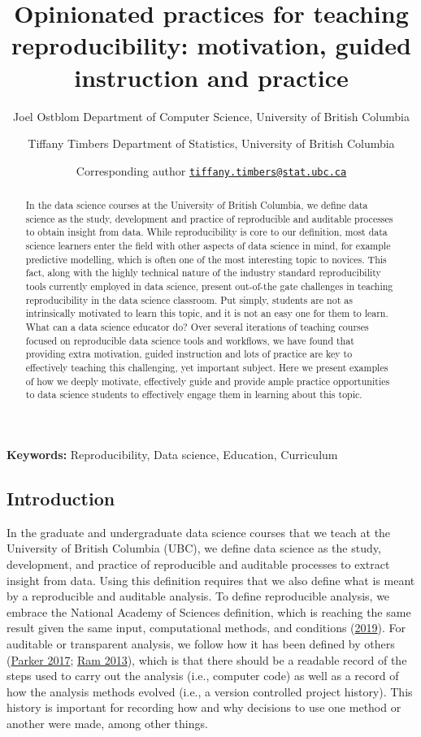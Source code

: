 \documentclass[
  12 pt,
]{paper}
\title{Opinionated practices for teaching reproducibility: motivation, guided instruction and practice}
\author{Joel Ostblom \small Department of Computer Science, University of British Columbia \and Tiffany Timbers \small Department of Statistics, University of British Columbia \and \footnotesize Corresponding author \href{mailto:tiffany.timbers@stat.ubc.ca}{\nolinkurl{tiffany.timbers@stat.ubc.ca}}}
\date{}
\begin{document}
\maketitle
\begin{abstract}
In the data science courses at the University of British Columbia,
we define data science as the study, development
and practice of reproducible
and auditable processes to obtain insight from data.
While reproducibility is core to our definition,
most data science learners enter the field with other aspects of data science in mind,
for example predictive modelling, which is often one of the most interesting topic to novices.
This fact, along with the highly technical nature
of the industry standard reproducibility tools currently employed in data science,
present out-of-the gate challenges in teaching reproducibility in the data science classroom.
Put simply, students are not as intrinsically motivated to learn this topic,
and it is not an easy one for them to learn. What can a data science educator do?
Over several iterations of teaching courses focused on reproducible data science tools and workflows,
we have found that providing extra motivation, guided instruction
and lots of practice are key to effectively teaching this challenging, yet important subject.
Here we present examples of how we deeply motivate, effectively guide
and provide ample practice opportunities to data science students
to effectively engage them in learning about this topic.
\end{abstract}

\textbf{Keywords:} Reproducibility, Data science, Education, Curriculum

\newpage
\doublespacing

\hypertarget{introduction}{%
\subsection{Introduction}\label{introduction}}

In the graduate and undergraduate data science courses that we teach
at the University of British Columbia (UBC),
we define data science as the study, development, and practice of
reproducible and auditable processes to extract insight from data.
Using this definition requires that we also define
what is meant by a reproducible and auditable analysis.
To define reproducible analysis,
we embrace the National Academy of Sciences definition,
which is reaching the same result given the same input, computational methods,
and conditions (\protect\hyperlink{ref-national2019reproducibility}{2019}).
For auditable or transparent analysis,
we follow how it has been defined by others (\protect\hyperlink{ref-parker2017opinionated}{Parker 2017}; \protect\hyperlink{ref-ram2013git}{Ram 2013}),
which is that there should be a readable record of the steps used to carry out the analysis
(i.e., computer code)
as well as a record of how the analysis methods evolved
(i.e., a version controlled project history).
This history is important for recording how and why
decisions to use one method or another were made,
among other things.
\end{document}
